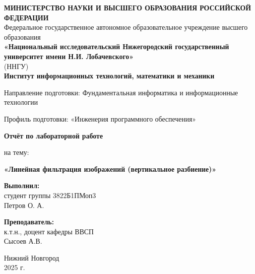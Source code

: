 \documentclass[12pt,a4paper]{extarticle}
\begin{document}
	
	\begin{titlepage}
		\begin{center}
			
			\onehalfspacing
			
			\begin{center}
				\textbf{МИНИСТЕРСТВО НАУКИ И ВЫСШЕГО ОБРАЗОВАНИЯ РОССИЙСКОЙ ФЕДЕРАЦИИ} \\ 			
				\vspace{0.5cm}
				Федеральное государственное автономное образовательное учреждение высшего образования \\ 
				\vspace{0.5cm}
				\textbf{«Национальный исследовательский Нижегородский государственный университет имени Н.И. Лобачевского»} \\
				(ННГУ)\\
				\vspace{0.5cm}
				\textbf{Институт информационных технологий, математики и механики}
			\end{center}
			\vspace{0.5cm}
			\begin{center}
			Направление подготовки: Фундаментальная информатика и информационные технологии
			
			
			Профиль подготовки: «Инженерия программного обеспечения»
			\end{center}
			\vspace{2.5cm}
			\begin{center}
				\textbf{Отчёт по лабораторной работе}

				на тему: 
				
				\textbf{«Линейная фильтрация изображений (вертикальное разбиение)»}
			\end{center}
			
			\vspace{2.5cm}
			
			\begin{flushright}
				\textbf{Выполнил:} \\
				студент группы 3822Б1ПМоп3 \\
				Петров О. А. \\
				
				\vspace{1cm}
				
			\noindent\textbf{Преподаватель:} \\
			к.т.н., доцент кафедры ВВСП \\
			{Сысоев А.В.}
			\end{flushright}
			
			\vspace{2em}
			
			\vfill
			
			\begin{center}
				Нижний Новгород \\
				2025 г.
			\end{center}
			
		\end{center}
	\end{titlepage}
	
\end{document}
